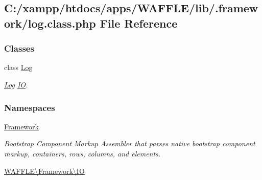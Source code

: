 \hypertarget{log_8class_8php}{}\subsection{C\+:/xampp/htdocs/apps/\+W\+A\+F\+F\+L\+E/lib/.framework/log.class.\+php File Reference}
\label{log_8class_8php}
\subsubsection*{Classes}
\begin{DoxyCompactItemize}
\item 
class \hyperlink{class_w_a_f_f_l_e_1_1_framework_1_1_i_o_1_1_log}{Log}
\begin{DoxyCompactList}\small\item\em \hyperlink{class_w_a_f_f_l_e_1_1_framework_1_1_i_o_1_1_log}{Log} \hyperlink{namespace_w_a_f_f_l_e_1_1_framework_1_1_i_o}{IO}. \end{DoxyCompactList}\end{DoxyCompactItemize}
\subsubsection*{Namespaces}
\begin{DoxyCompactItemize}
\item 
 \hyperlink{namespace_framework}{Framework}
\begin{DoxyCompactList}\small\item\em Bootstrap Component Markup Assembler that parses native bootstrap component markup, containers, rows, columns, and elements. \end{DoxyCompactList}\item 
 \hyperlink{namespace_w_a_f_f_l_e_1_1_framework_1_1_i_o}{W\+A\+F\+F\+L\+E\textbackslash{}\+Framework\textbackslash{}\+IO}
\end{DoxyCompactItemize}

